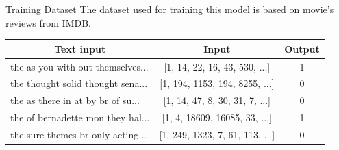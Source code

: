 \begin{frame}{Training Dataset}
    The dataset used for training this model is based on movie's reviews from IMDB.

    \qquad

    \begin{tabular}{lcc}
        \toprule
        \multicolumn{1}{c}{\textbf{Text input}} & \textbf{Input} & \textbf{Output} \\
        \midrule
        the as you with out themselves... & [1, 14, 22, 16, 43, 530, ...] & 1 \\
        the thought solid thought sena... & [1, 194, 1153, 194, 8255, ...] & 0 \\
        the as there in at by br of su... & [1, 14, 47, 8, 30, 31, 7, ...] & 0 \\
        the of bernadette mon they hal... & [1, 4, 18609, 16085, 33, ...] & 1 \\
        the sure themes br only acting... & [1, 249, 1323, 7, 61, 113, ...] & 0 \\
        \bottomrule
    \end{tabular}
\end{frame}
